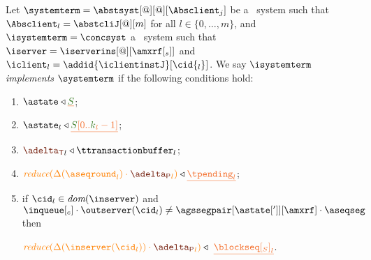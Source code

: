 \begin{definition} \label{def:implementation}
Let  $\systemterm = \abstsyst[@][@][\Absclient_j]$ be a \tgspcalculus\ system
 such that $\Absclient_l={\abstcliJ[@][m]}$ for all
$l\in\{0,\ldots,m\}$, and  $\isystemterm = \concsyst$  a \igsp\  system such that  $\iserver = \iserverins[@][\amxrf[_s]]$ and $\iclient_l = \addid{\iclientinstJ}[{\cid{_l}}]$.
 We say {\em $\isystemterm$ implements $\systemterm$} if the following conditions hold:

\begin{enumerate}
	\item \label{prop_stateserver} $\astate \triangleleft \flatten{\queuemessage}$;

	\item \label{prop_state_known} $\astate_l \triangleleft \flatten {\queuemessage[0 .. \tknown_l - 1]}$;
	
	\item \label{prop_transactions} ${\transactionbuffer}_l\triangleleft{\ttransactionbuffer}_l$;
	
	\item \label{prop_pending}  
		$\ireduce{\igetdeltas{\pending_l}\cdot {\pushbuffer}_l} \triangleleft \flatten{\tpending_l}$;


	\item \label{prop_sent}  
	   
	   if $\cid_l \in \dom\inserver$ and $\inclient \cdot\outserver(\cid_l) \neq \agssegpair[{\astate[']}][{\amxrf}]\cdot\aseqseg$ %
	   then 
	   
	   $ \ireduce{\igetdeltas{\inserver(\cid_l)}\cdot {\pushbuffer}_l} \triangleleft \ \flatten{{\tsent}_l}$. 
	 


\end{enumerate}
\end{definition}
